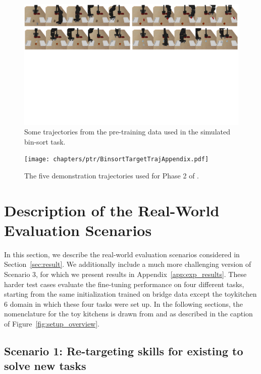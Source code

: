 \documentclass[../thesis.tex]{subfiles}
\begin{document}
\begin{figure}
\centering
  \includegraphics[width=\textwidth]{chapters/ptr/BinsortPretrainTrajAppendix.pdf}
  \caption{\label{fig:app_pretrain_rollout_sim} \footnotesize {Some trajectories from the pre-training data used in the simulated bin-sort task.}}
\end{figure}

\begin{figure}
\centering
  \texttt{[image: chapters/ptr/BinsortTargetTrajAppendix.pdf]}
  \caption{\label{fig:app_targ_rollout_sim} \footnotesize {The five demonstration trajectories used for Phase 2 of \ptrmethodname.}}
\end{figure}

\section{Description of the Real-World Evaluation Scenarios}
\label{app:tasks}
In this section, we describe the real-world evaluation scenarios considered in Section~\ref{sec:result}. We additionally include a much more challenging version of Scenario 3, for which we present results in Appendix~\ref{app:exp_results}. These harder test cases evaluate the fine-tuning performance on four different tasks, starting from the same initialization trained on bridge data except the toykitchen 6 domain in which these four tasks were set up. In the following sections, the nomenclature for the toy kitchens is drawn from \citet{ebert2021bridge} and as described in the caption of Figure~\ref{fig:setup_overview}.

\subsection{Scenario 1: Re-targeting skills for existing to solve new tasks}
\end{document}
